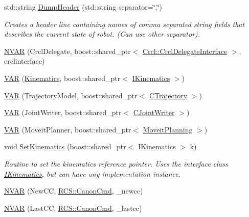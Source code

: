 \begin{DoxyCompactItemize}
std\-::string \hyperlink{structRCS_1_1CController_aaf2b0286ce10f78e5eee44e3613e588e}{Dump\-Header} (std\-::string separator=\char`\"{},\char`\"{})
\begin{DoxyCompactList}\small\item\em Creates a header line containing names of comma separated string fields that describes the current state of robot. (Can use other separator). \end{DoxyCompactList}\item 
\hyperlink{structRCS_1_1CController_a217e4bc45f9cc45a8b4e927e3e76d9c6}{N\-V\-A\-R} (Crcl\-Delegate, boost\-::shared\-\_\-ptr$<$ \hyperlink{classCrcl_1_1CrclDelegateInterface}{Crcl\-::\-Crcl\-Delegate\-Interface} $>$, crclinterface)
\item 
\hyperlink{structRCS_1_1CController_abb822466798247a45d3206ecae9c36fc}{V\-A\-R} (\hyperlink{SanityCheckTests_8cpp_ac2d60ae645ce73be6021c92b37789e7c}{Kinematics}, boost\-::shared\-\_\-ptr$<$ \hyperlink{classIKinematics}{I\-Kinematics} $>$)
\item 
\hyperlink{structRCS_1_1CController_a220e4784a98f240d3421ae67c79356d2}{V\-A\-R} (Trajectory\-Model, boost\-::shared\-\_\-ptr$<$ \hyperlink{classCTrajectory}{C\-Trajectory} $>$)
\item 
\hyperlink{structRCS_1_1CController_abe34674042d0b1b983a3e4117310f66c}{V\-A\-R} (Joint\-Writer, boost\-::shared\-\_\-ptr$<$ \hyperlink{classCJointWriter}{C\-Joint\-Writer} $>$)
\item 
\hyperlink{structRCS_1_1CController_a4bada8d96b15d19a1b4255f00993a241}{V\-A\-R} (Moveit\-Planner, boost\-::shared\-\_\-ptr$<$ \hyperlink{classMoveitPlanning}{Moveit\-Planning} $>$)
\item 
void \hyperlink{structRCS_1_1CController_a2733d3cf36b11a6b257e04a969e03abf}{Set\-Kinematics} (boost\-::shared\-\_\-ptr$<$ \hyperlink{classIKinematics}{I\-Kinematics} $>$ k)
\begin{DoxyCompactList}\small\item\em Routine to set the kinematics reference pointer. Uses the interface class \hyperlink{classIKinematics}{I\-Kinematics}, but can have any implementation instance. \end{DoxyCompactList}\item 
\hyperlink{structRCS_1_1CController_a5113cb8a1cfaf75459e8a2b13802312e}{N\-V\-A\-R} (New\-C\-C, \hyperlink{structRCS_1_1CanonCmd}{R\-C\-S\-::\-Canon\-Cmd}, \-\_\-newcc)
\item 
\hyperlink{structRCS_1_1CController_a1b85d1d02e33dbfe25173575f17d4498}{N\-V\-A\-R} (Last\-C\-C, \hyperlink{structRCS_1_1CanonCmd}{R\-C\-S\-::\-Canon\-Cmd}, \-\_\-lastcc)

\end{DoxyCompactItemize}

